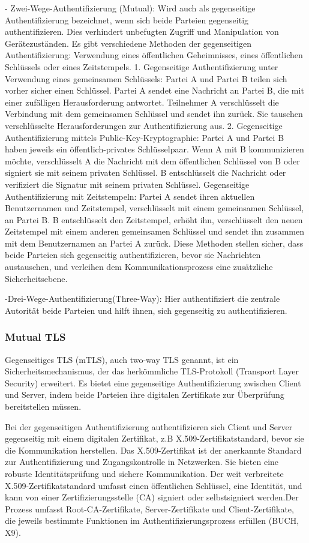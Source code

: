  - Zwei-Wege-Authentifizierung (Mutual): Wird auch als gegenseitige Authentifizierung bezeichnet, wenn sich beide Parteien gegenseitig authentifizieren. Dies verhindert unbefugten Zugriff und Manipulation von Gerätezuständen. 
Es gibt verschiedene Methoden der gegenseitigen Authentifizierung: Verwendung eines öffentlichen Geheimnisses, eines öffentlichen Schlüssels oder eines Zeitstempels. 
1. Gegenseitige Authentifizierung unter Verwendung eines gemeinsamen Schlüssels:
 Partei A und Partei B teilen sich vorher sicher einen Schlüssel. Partei A sendet eine Nachricht an Partei B, die mit einer zufälligen Herausforderung antwortet. Teilnehmer A verschlüsselt die Verbindung mit dem gemeinsamen Schlüssel und sendet ihn zurück. Sie tauschen verschlüsselte Herausforderungen zur Authentifizierung aus.
 2. Gegenseitige Authentifizierung mittels Public-Key-Kryptographie:
Partei A und Partei B haben jeweils ein öffentlich-privates Schlüsselpaar. Wenn A mit B kommunizieren möchte, verschlüsselt A die Nachricht mit dem öffentlichen Schlüssel von B oder signiert sie mit seinem privaten Schlüssel. B entschlüsselt die Nachricht oder verifiziert die Signatur mit seinem privaten Schlüssel. 
Gegenseitige Authentifizierung mit Zeitstempeln:
Partei A sendet ihren aktuellen Benutzernamen und Zeitstempel, verschlüsselt mit einem gemeinsamen Schlüssel, an Partei B. B entschlüsselt den Zeitstempel, erhöht ihn, verschlüsselt den neuen Zeitstempel mit einem anderen gemeinsamen Schlüssel und sendet ihn zusammen mit dem Benutzernamen an Partei A zurück. Diese Methoden stellen sicher, dass beide Parteien sich gegenseitig authentifizieren, bevor sie Nachrichten austauschen, und verleihen dem Kommunikationsprozess eine zusätzliche Sicherheitsebene. 

-Drei-Wege-Authentifizierung(Three-Way): Hier authentifiziert die zentrale Autorität beide Parteien und hilft ihnen, sich gegenseitig zu authentifizieren.


\subsubsection{Mutual TLS}

Gegenseitiges TLS (mTLS), auch two-way TLS genannt, ist ein Sicherheitsmechanismus, der das herkömmliche TLS-Protokoll (Transport Layer Security) erweitert. Es bietet eine gegenseitige Authentifizierung zwischen Client und Server, indem beide Parteien ihre digitalen Zertifikate zur Überprüfung bereitstellen müssen.

Bei der gegenseitigen Authentifizierung authentifizieren sich Client und Server gegenseitig mit einem digitalen Zertifikat, z.B  X.509-Zertifikatstandard, bevor sie die Kommunikation herstellen. Das X.509-Zertifikat ist der anerkannte Standard zur Authentifizierung und Zugangskontrolle in Netzwerken. Sie bieten eine robuste Identitätsprüfung und sichere Kommunikation. Der weit verbreitete X.509-Zertifikatstandard umfasst einen öffentlichen Schlüssel, eine Identität, und kann von einer Zertifizierungsstelle (CA) signiert oder selbstsigniert werden.Der Prozess umfasst Root-CA-Zertifikate, Server-Zertifikate und Client-Zertifikate, die jeweils bestimmte Funktionen im Authentifizierungsprozess erfüllen (BUCH, X9).

